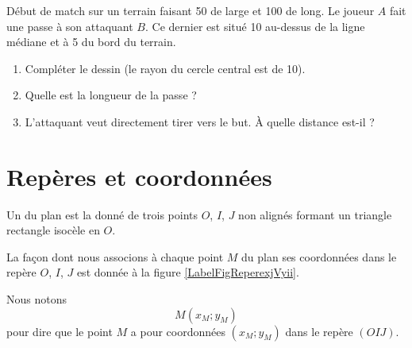
Début de match sur un terrain faisant \unit{50}{\meter} de large et \unit{100}{\meter} de long. Le joueur \( A\) fait une passe à son attaquant \( B\). Ce dernier est situé \unit{10}{\meter} au-dessus de la ligne médiane et à \unit{5}{\meter} du bord du terrain.

\begin{center}
   
\end{center}

\begin{enumerate}
    \item
        Compléter le dessin (le rayon du cercle central est de \unit{10}{\meter}).
    \item
        Quelle est la longueur de la passe ?
    \item
        L'attaquant veut directement tirer vers le but. À quelle distance est-il ?
\end{enumerate}

\section{Repères et coordonnées}

\begin{definition}
    Un  du plan est la donné de trois points \( O\), \( I\), \( J\) non alignés formant un triangle rectangle isocèle en  \( O\).
\end{definition}

La façon dont nous associons à chaque point \( M\) du plan ses coordonnées dans le repère \( O\), \( I\), \( J\) est donnée à la figure \ref{LabelFigReperexjVyii}.
\newcommand{\CaptionFigReperexjVyii}{Lire les coordonnées du point \( M\) dans le repère \( OIJ\).}


Nous notons 
\begin{equation}
    M(x_M;y_M)
\end{equation}
pour dire que le point \( M\) a pour coordonnées \( (x_M;y_M)\) dans le repère \( (OIJ)\).

